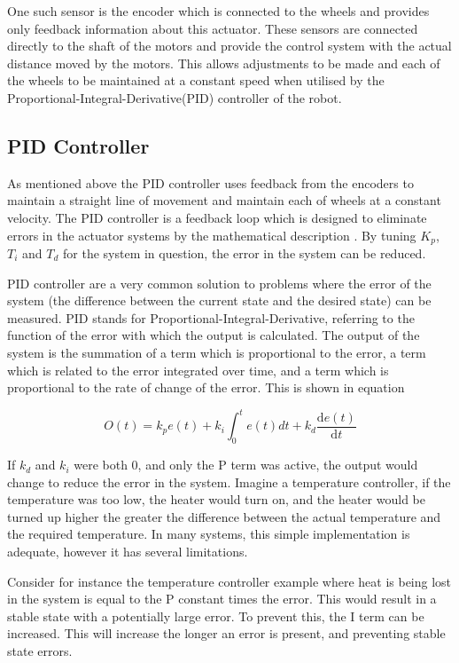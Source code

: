 One such sensor is the encoder which is connected to the wheels and provides only feedback information about this actuator. These sensors are connected directly to the shaft of the motors and provide the control system with the actual distance moved by the motors. This allows adjustments to be made and each of the wheels to be maintained at a constant speed when utilised by the Proportional-Integral-Derivative(PID) controller of the robot.  

\subsection{PID Controller}\label{litreview/robotics/pid}
As mentioned above the PID controller uses feedback from the encoders to maintain a straight line of movement and maintain each of wheels at a constant velocity. The PID controller is a feedback loop which is designed to eliminate errors in the actuator systems by the mathematical description . By tuning $ K_p $, $ T_i $ and $ T_d $ for the system in question, the error in the system can be reduced.   

PID controller are a very common solution to problems where the error of the system (the difference between the current state and the desired state) can be measured. PID stands for Proportional-Integral-Derivative, referring to the function of the error with which the output is calculated. The output of the system is the summation of a term which is proportional to the error, a term which is related to the error integrated over time, and a term which is proportional to the rate of change of the error. This is shown in equation 

$$ O(t) = k_{p}e(t) + k_i\int_{0}^{t}e(t)dt + k_d \frac{\mathrm{d} e(t) }{\mathrm{d} t}$$

If $k_d$ and $k_i$ were both 0, and only the P term was active, the output would change to reduce the error in the system. Imagine a temperature controller, if the temperature was too low, the heater would turn on, and the heater would be turned up higher the greater the difference between the actual temperature and the required temperature. In many systems, this simple implementation is adequate, however it has several limitations. 

Consider for instance the temperature controller example where heat is being lost in the system is equal to the P constant times the error. This would result in a stable state with a potentially large error. To prevent this, the I term can be increased. This will increase the longer an error is present, and preventing stable state errors. 

